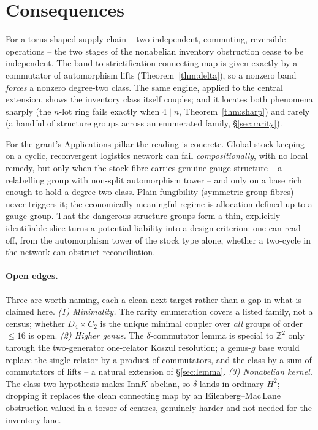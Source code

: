 \documentclass[11pt]{article}
\theoremstyle{definition}
\newcommand{\Z}{\mathbb{Z}}
\newcommand{\Inn}{\mathrm{Inn}}
\begin{document}
\section{Consequences}\label{sec:conc}

For a torus-shaped supply chain -- two independent, commuting, reversible operations -- the two
stages of the nonabelian inventory obstruction cease to be independent. The band-to-strictification
connecting map is given exactly by a commutator of automorphism lifts
(Theorem~\ref{thm:delta}), so a nonzero band \emph{forces} a nonzero degree-two class. The same
engine, applied to the central extension, shows the inventory class itself couples; and it
locates both phenomena sharply (the $n$-lot ring fails exactly when $4\mid n$,
Theorem~\ref{thm:sharp}) and rarely (a handful of structure groups across an enumerated family,
\S\ref{sec:rarity}).

For the grant's Applications pillar the reading is concrete. Global stock-keeping on a cyclic,
reconvergent logistics network can fail \emph{compositionally}, with no local remedy, but only
when the stock fibre carries genuine gauge structure -- a relabelling group with non-split
automorphism tower -- and only on a base rich enough to hold a degree-two class. Plain fungibility
(symmetric-group fibres) never triggers it; the economically meaningful regime is allocation
defined up to a gauge group. That the dangerous structure groups form a thin, explicitly
identifiable slice turns a potential liability into a design criterion: one can read off, from the
automorphism tower of the stock type alone, whether a two-cycle in the network can obstruct
reconciliation.

\paragraph{Open edges.} Three are worth naming, each a clean next target rather than a gap in what
is claimed here. \emph{(1) Minimality.} The rarity enumeration covers a listed family, not a
census; whether $D_4\times C_2$ is the unique minimal coupler over \emph{all} groups of order
$\le16$ is open. \emph{(2) Higher genus.} The $\delta$-commutator lemma is special to $\Z^2$ only
through the two-generator one-relator Koszul resolution; a genus-$g$ base would replace the single
relator by a product of commutators, and the class by a sum of commutators of lifts -- a natural
extension of \S\ref{sec:lemma}. \emph{(3) Nonabelian kernel.} The class-two hypothesis makes
$\Inn K$ abelian, so $\delta$ lands in ordinary $H^2$; dropping it replaces the clean connecting
map by an Eilenberg--Mac\,Lane obstruction valued in a torsor of centres, genuinely harder and not
needed for the inventory lane.
\end{document}
